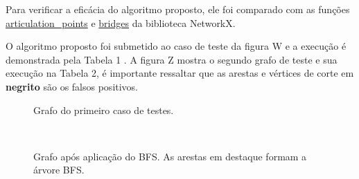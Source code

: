\documentclass[
	article,
	12pt,
	openright,
	oneside,
	a4paper,
	english,
	french,
	spanish,
	brazil
	]{abntex2}
\begin{document}
Para verificar a eficácia do algoritmo proposto, ele foi comparado com as funções \href{https://networkx.github.io/documentation/networkx-1.10/reference/generated/networkx.algorithms.components.biconnected.articulation_points.html}{articulation\_points} e \href{https://networkx.github.io/documentation/latest/reference/algorithms/generated/networkx.algorithms.bridges.bridges.html}{bridges} da biblioteca NetworkX.

O algoritmo proposto foi submetido ao caso de teste da figura W e a execução é demonstrada pela Tabela 1 . A figura Z mostra o segundo grafo de teste e sua execução na Tabela 2, é importante ressaltar que as arestas e vértices de corte em \textbf{negrito} são os falsos positivos.

\begin{figure*}[htb]
    \centering
    \begin{subfigure}{0.45\textwidth}
    \caption{Grafo do primeiro caso de testes.}
    \label{fig:caso-teste1}
    \end{subfigure}
    ~
    \begin{subfigure}{0.45\textwidth}
    \caption{Grafo após aplicação do BFS. As arestas em destaque formam a árvore BFS. }
    \label{fig:caso-teste1-bfs}
\end{subfigure}
\end{figure*}
\end{document}
